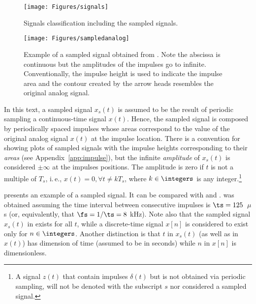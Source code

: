 \begin{figure}
	\centering
		\texttt{[image: Figures/signals]}		
	\caption{Signals classification including the sampled signals.\label{fig:signals}}
\end{figure}


\begin{figure}
	\centering
		\texttt{[image: Figures/sampledanalog]}		
	\caption[Example of sampled signal]{Example of a sampled signal obtained from . Note the abscissa is continuous but the amplitudes of the impulses go to infinite. Conventionally, the impulse height is used to indicate the impulse area and the contour created by the arrow heads resembles the original analog signal.\label{fig:sampledanalog}}
\end{figure}

In this text, a sampled signal $x_s(t)$ is assumed to be the result of periodic sampling a continuous-time signal $x(t)$. Hence, the sampled signal is composed by periodically spaced impulses whose areas correspond to the value of the original analog signal $x(t)$ at the impulse location. There is a convention for showing plots of sampled signals with the impulse heights corresponding to their \emph{areas} (see Appendix~\ref{app:impulse}), but the infinite \emph{amplitude} of $x_s(t)$ is considered $\pm \infty$ at the impulses positions. The amplitude is zero if $t$ is not a multiple of $T_s$, i.\,e., $x(t)=0, \forall t \ne k T_s$, where $k \in \integers$ is any integer.\footnote{A signal $z(t)$ that contain impulses $\delta(t)$ but is not obtained via periodic sampling, will not be denoted with the subscript $s$ nor considered a sampled signal.}

 presents an example of a sampled signal. It can be compared with  and .  was obtained assuming the time interval between consecutive impulses is $\ts=125$~$\mu$s (or, equivalently, that $\fs = 1/\ts = 8$ kHz). Note also that the sampled signal $x_s(t)$ in  exists for all $t$, while a discrete-time signal $x[n]$ is considered to exist only for $n \in \integers$. 
Another distinction is that $t$ in $x_s(t)$ (as well as in $x(t)$) has dimension of time (assumed to be in seconds) while $n$ in $x[n]$ is dimensionless.

